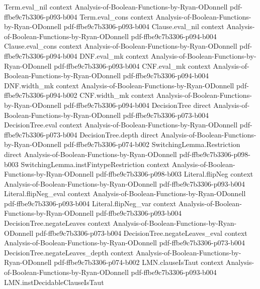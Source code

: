 \begin{lemma}
  {Term.eval_nil}
  {context}
  {Analysis-of-Boolean-Functions-by-Ryan-ODonnell}
  {pdf-ffbe9c7b3306-p093-b004}
\proofstep
  {Term.eval_cons}
  {context}
  {Analysis-of-Boolean-Functions-by-Ryan-ODonnell}
  {pdf-ffbe9c7b3306-p093-b004}
\proofstep
  {Clause.eval_nil}
  {context}
  {Analysis-of-Boolean-Functions-by-Ryan-ODonnell}
  {pdf-ffbe9c7b3306-p094-b004}
\proofstep
  {Clause.eval_cons}
  {context}
  {Analysis-of-Boolean-Functions-by-Ryan-ODonnell}
  {pdf-ffbe9c7b3306-p094-b004}
\proofstep
  {DNF.eval_mk}
  {context}
  {Analysis-of-Boolean-Functions-by-Ryan-ODonnell}
  {pdf-ffbe9c7b3306-p093-b004}
\proofstep
  {CNF.eval_mk}
  {context}
  {Analysis-of-Boolean-Functions-by-Ryan-ODonnell}
  {pdf-ffbe9c7b3306-p094-b004}
\proofstep
  {DNF.width_mk}
  {context}
  {Analysis-of-Boolean-Functions-by-Ryan-ODonnell}
  {pdf-ffbe9c7b3306-p094-b002}
\proofstep
  {CNF.width_mk}
  {context}
  {Analysis-of-Boolean-Functions-by-Ryan-ODonnell}
  {pdf-ffbe9c7b3306-p094-b004}
\proofstep
  {DecisionTree}
  {direct}
  {Analysis-of-Boolean-Functions-by-Ryan-ODonnell}
  {pdf-ffbe9c7b3306-p073-b004}
\proofstep
  {DecisionTree.eval}
  {context}
  {Analysis-of-Boolean-Functions-by-Ryan-ODonnell}
  {pdf-ffbe9c7b3306-p073-b004}
\proofstep
  {DecisionTree.depth}
  {direct}
  {Analysis-of-Boolean-Functions-by-Ryan-ODonnell}
  {pdf-ffbe9c7b3306-p074-b002}
\proofstep
  {SwitchingLemma.Restriction}
  {direct}
  {Analysis-of-Boolean-Functions-by-Ryan-ODonnell}
  {pdf-ffbe9c7b3306-p098-b003}
\proofstep
  {SwitchingLemma.instFintypeRestriction}
  {context}
  {Analysis-of-Boolean-Functions-by-Ryan-ODonnell}
  {pdf-ffbe9c7b3306-p098-b003}
\proofstep
  {Literal.flipNeg}
  {context}
  {Analysis-of-Boolean-Functions-by-Ryan-ODonnell}
  {pdf-ffbe9c7b3306-p093-b004}
\proofstep
  {Literal.flipNeg_eval}
  {context}
  {Analysis-of-Boolean-Functions-by-Ryan-ODonnell}
  {pdf-ffbe9c7b3306-p093-b004}
\proofstep
  {Literal.flipNeg_var}
  {context}
  {Analysis-of-Boolean-Functions-by-Ryan-ODonnell}
  {pdf-ffbe9c7b3306-p093-b004}
\proofstep
  {DecisionTree.negateLeaves}
  {context}
  {Analysis-of-Boolean-Functions-by-Ryan-ODonnell}
  {pdf-ffbe9c7b3306-p073-b004}
\proofstep
  {DecisionTree.negateLeaves_eval}
  {context}
  {Analysis-of-Boolean-Functions-by-Ryan-ODonnell}
  {pdf-ffbe9c7b3306-p073-b004}
\proofstep
  {DecisionTree.negateLeaves_depth}
  {context}
  {Analysis-of-Boolean-Functions-by-Ryan-ODonnell}
  {pdf-ffbe9c7b3306-p074-b002}
\proofstep
  {LMN.clauseIsTaut}
  {context}
  {Analysis-of-Boolean-Functions-by-Ryan-ODonnell}
  {pdf-ffbe9c7b3306-p093-b004}
\proofstep
  {LMN.instDecidableClauseIsTaut}

\end{lemma}
